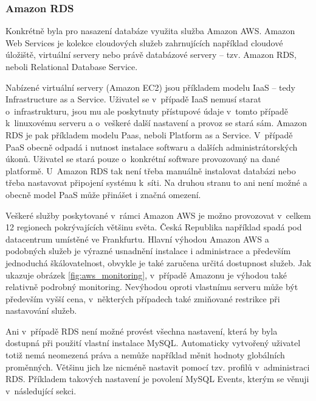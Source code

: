 \documentclass[thesis=B,czech]{FITthesis}[2012/06/26]
\begin{document}
\subsubsection{Amazon RDS}
\label{amazon-aws}
	Konkrétně byla pro nasazení databáze využita služba Amazon AWS\cite{aws}. Amazon Web Services je kolekce cloudových služeb zahrnujících například cloudové úložiště, virtuální servery nebo právě databázové servery -- tzv. Amazon RDS, neboli Relational Database Service. 
	
	Nabízené virtuální servery (Amazon EC2) jsou příkladem modelu IaaS -- tedy Infrastructure as a Service. Uživatel se v~případě IaaS nemusí starat o~infrastrukturu, jsou mu ale poskytnuty přístupové údaje v~tomto případě k~linuxovému serveru a o~veškeré další nastavení a provoz se stará sám. Amazon RDS je pak příkladem modelu Paas, neboli Platform as a Service. V~případě PaaS obecně odpadá i nutnost instalace softwaru a dalších administrátorských úkonů. Uživatel se stará pouze o~konkrétní software provozovaný na dané platformě. U~Amazon RDS tak není třeba manuálně instalovat databázi nebo třeba nastavovat připojení systému k~síti. Na druhou stranu to ani není možné a obecně model PaaS může přinášet i značná omezení. 
	
	Veškeré služby poskytované v~rámci Amazon AWS je možno provozovat v~celkem 12 regionech pokrývajících většinu světa. Česká Republika například spadá pod datacentrum umístěné ve Frankfurtu. Hlavní výhodou Amazon AWS a podobných služeb je výrazné usnadnění instalace i administrace a především jednoduchá škálovatelnost, obvykle je také zaručena určitá dostupnost služeb. Jak ukazuje obrázek \ref{fig:aws_monitoring}, v~případě Amazonu je výhodou také relativně podrobný monitoring. Nevýhodou oproti vlastnímu serveru může být především vyšší cena, v~některých případech také zmiňované restrikce při nastavování služeb. 
	
	Ani v~případě RDS není možné provést všechna nastavení, která by byla dostupná při použití vlastní instalace MySQL. Automaticky vytvořený uživatel totiž nemá neomezená práva a nemůže například měnit hodnoty globálních proměnných. Většinu jich lze nicméně nastavit pomocí tzv. profilů v~administraci RDS. Příkladem takových nastavení je povolení MySQL Events, kterým se věnuji v~následující sekci. 
\end{document}
